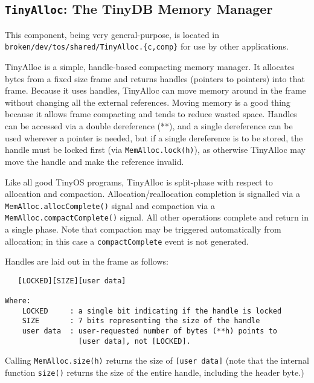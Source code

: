 \documentclass[11pt]{article}
\renewcommand{\baselinestretch}{1.2}
\newcommand{\docroot}{broken/dev}
\begin{document}
\subsection {{\tt TinyAlloc}: The TinyDB Memory Manager}
\label{sec:tinyalloc}
This component, being very general-purpose, is located in {\tt
\docroot/tos/shared/TinyAlloc.\{c,comp\}} for use by other applications.

TinyAlloc is a simple, handle-based compacting memory manager.  It
allocates bytes from a fixed size frame and returns handles (pointers
to pointers) into that frame.  Because it uses handles, TinyAlloc can
move memory around in the frame without changing all the external
references.  Moving memory is a good thing because it allows frame
compacting and tends to reduce wasted space.  Handles can be accessed
via a double dereference (**), and a single dereference can be used
wherever a pointer is needed, but if a single dereference is to be
stored, the handle must be locked first (via {\tt MemAlloc.lock(h)}),
as otherwise TinyAlloc may move the handle and make the reference
invalid.  

\vspace{.1in}
\renewcommand{\baselinestretch}{1.0}\rm
{}
\renewcommand{\baselinestretch}{1.2}\rm
\vspace{.1in}

   Like all good TinyOS programs, TinyAlloc is
   split-phase with
respect to allocation and compaction.  Allocation/reallocation
completion is signalled via a {\tt MemAlloc.allocComplete()} signal and
compaction via a {\tt MemAlloc.compactComplete()} signal.  All other
operations complete and return in a single phase. Note that compaction
may be triggered automatically from allocation; in this case a
{\tt compactComplete}  event is not generated.

Handles are laid out in the frame as follows:
\begin{verbatim}
   [LOCKED][SIZE][user data] 

Where: 
    LOCKED     : a single bit indicating if the handle is locked 
    SIZE       : 7 bits representing the size of the handle 
    user data  : user-requested number of bytes (**h) points to
                 [user data], not [LOCKED].
\end{verbatim}
   Calling {\tt MemAlloc.size(h)} returns the size of {\tt [user
data]} (note that the internal function {\tt size()} returns the size of the
entire handle, including the header byte.)
\end{document}
